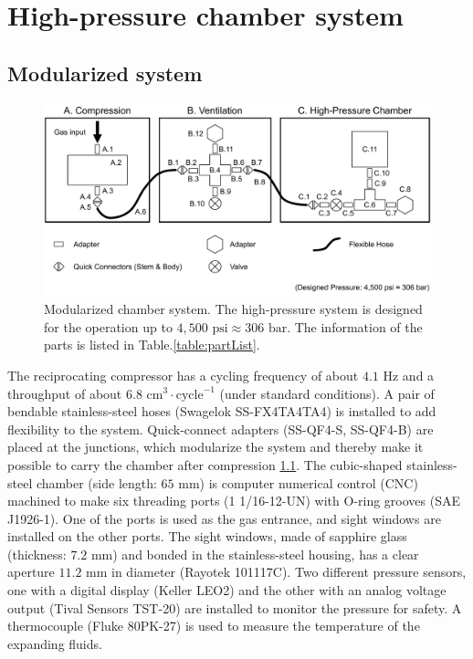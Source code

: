 
\chapter{High-pressure chamber system}
\label{sec:ap2}

\section{Modularized system}
\label{sec:ap2-1}

\begin{figure}[ht!]
\centering
\includegraphics[width=130mm]{figures/ap2/system/moduleSystem.pdf}
\caption{Modularized chamber system. The high-pressure system is designed for the operation up to $4,500 \text{ psi} \approx 306 \text{ bar}$. The information of the parts is listed in Table.\ref{table:partList}.}
\label{fig:moduleSystem}
\end{figure}

The reciprocating compressor has a cycling frequency of about $4.1 \text{ Hz}$ and a throughput of about $6.8 \text{ cm}^{3} \cdot \text{cycle}^{-1}$ (under standard conditions). A pair of bendable stainless-steel hoses (Swagelok SS-FX4TA4TA4) is installed to add flexibility to the system. Quick-connect adapters (SS-QF4-S, SS-QF4-B) are placed at the junctions, which modularize the system and thereby make it possible to carry the chamber after compression \ref{fig:moduleSystem}. The cubic-shaped stainless-steel chamber (side length: $65 \text{ mm}$) is computer numerical control (CNC) machined to make six threading ports (1 1/16-12-UN) with O-ring grooves (SAE J1926-1). One of the ports is used as the gas entrance, and sight windows are installed on the other ports. The sight windows, made of sapphire glass (thickness: $7.2 \text{ mm}$) and bonded in the stainless-steel housing, has a clear aperture $11.2 \text{ mm}$ in diameter (Rayotek 101117C). Two different pressure sensors, one with a digital display (Keller LEO2) and the other with an analog voltage output (Tival Sensors TST-20) are installed to monitor the pressure for safety. A thermocouple (Fluke 80PK-27) is used to measure the temperature of the expanding fluids.

